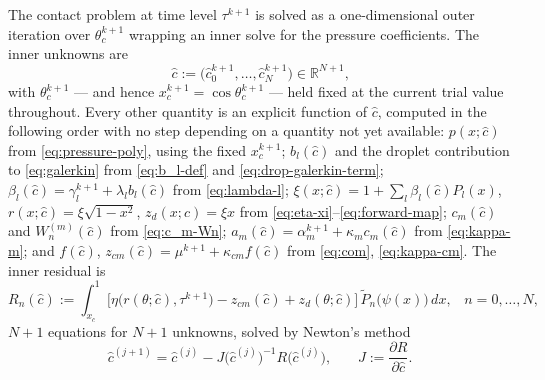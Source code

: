 \hspace*{1em}The contact problem at time level $\tau^{k+1}$ is solved as a one-dimensional outer iteration over $\theta_c^{k+1}$ wrapping an inner solve for the pressure coefficients. The inner unknowns are
\begin{equation}
    \hat c := \big(\hat c_0^{k+1},\dots,\hat c_N^{k+1}\big)\in\mathbb R^{N+1}\text{,}
    \label{eq:newton-unknowns}
\end{equation}
with $\theta_c^{k+1}$ --- and hence $x_c^{k+1}=\cos\theta_c^{k+1}$ --- held fixed at the current trial value throughout. Every other quantity is an explicit function of $\hat c$, computed in the following order with no step depending on a quantity not yet available: $p(x;\hat c)$ from \eqref{eq:pressure-poly}, using the fixed $x_c^{k+1}$; $b_l(\hat c)$ and the droplet contribution to \eqref{eq:galerkin} from \eqref{eq:b_l-def} and \eqref{eq:drop-galerkin-term}; $\beta_l(\hat c)=\gamma_l^{k+1}+\lambda_lb_l(\hat c)$ from \eqref{eq:lambda-l}; $\xi(x;\hat c)=1+\sum_l\beta_l(\hat c)P_l(x)$, $r(x;\hat c)=\xi\sqrt{1-x^2}$, $z_d(x;\hat c)=\xi x$ from \eqref{eq:eta-xi}--\eqref{eq:forward-map}; $c_m(\hat c)$ and $W_n^{(m)}(\hat c)$ from \eqref{eq:c_m-Wn}; $a_m(\hat c)=\alpha_m^{k+1}+\kappa_mc_m(\hat c)$ from \eqref{eq:kappa-m}; and $f(\hat c)$, $z_{cm}(\hat c)=\mu^{k+1}+\kappa_{cm}f(\hat c)$ from \eqref{eq:com}, \eqref{eq:kappa-cm}. The inner residual is
\begin{equation}
    R_n(\hat c) := \int_{x_c}^1\Big[\eta\big(r(\theta;\hat c),\tau^{k+1}\big)-z_{cm}(\hat c)+z_d(\theta;\hat c)\Big]\,\tilde P_n\big(\psi(x)\big)\,dx\text{,}\quad n=0,\dots,N\text{,}
    \label{eq:newton-residual-galerkin}
\end{equation}
$N+1$ equations for $N+1$ unknowns, solved by Newton's method
\begin{equation}
    \hat c^{(j+1)} = \hat c^{(j)} - J\big(\hat c^{(j)}\big)^{-1}R\big(\hat c^{(j)}\big)\text{,}\qquad J:=\frac{\partial R}{\partial\hat c}\text{.}
    \label{eq:newton-step}
\end{equation}
